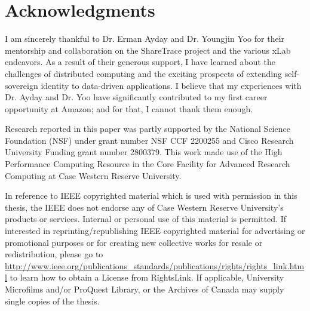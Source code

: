 \section*{Acknowledgments}
I am sincerely thankful to Dr. Erman Ayday and Dr. Youngjin Yoo for their mentorship and collaboration on the ShareTrace project and the various xLab endeavors. As a result of their generous support, I have learned about the challenges of distributed computing and the exciting prospects of extending self-sovereign identity to data-driven applications. I believe that my experiences with Dr. Ayday and Dr. Yoo have significantly contributed to my first career opportunity at Amazon; and for that, I cannot thank them enough.

Research reported in this paper was partly supported by the National Science Foundation (NSF) under grant number NSF CCF 2200255 and Cisco Research University Funding grant number 2800379. This work made use of the High Performance Computing Resource in the Core Facility for Advanced Research Computing at Case Western Reserve University.

In reference to IEEE copyrighted material which is used with permission in this thesis, the IEEE does not endorse any of Case Western Reserve University’s products or services. Internal or personal use of this material is permitted. If interested in reprinting/republishing IEEE copyrighted material for advertising or promotional purposes or for creating new collective works for resale or redistribution, please go to \url{http://www.ieee.org/publications_standards/publications/rights/rights_link.html} to learn how to obtain a License from RightsLink. If applicable, University Microfilms and/or ProQuest Library, or the Archives of Canada may supply single copies of the thesis.
\clearpage